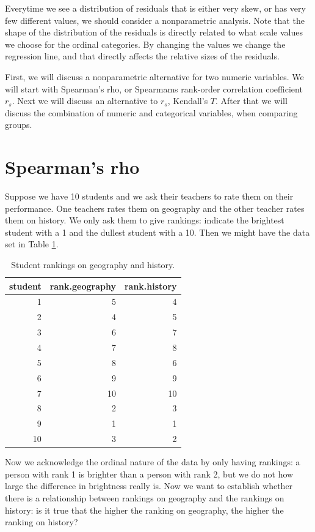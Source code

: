 \documentclass[]{report}\usepackage[]{graphicx}\usepackage[]{color}
\begin{document}
Everytime we see a distribution of residuals that is either very skew, or has very few different values, we should consider a nonparametric analysis. Note that the shape of the distribution of the residuals is directly related to what scale values we choose for the ordinal categories. By changing the values we change the regression line, and that directly affects the relative sizes of the residuals. 

First, we will discuss a nonparametric alternative for two numeric variables. We will start with Spearman's rho, or Spearmams rank-order correlation coefficient $r_s$. Next we will discuss an alternative to $r_s$, Kendall's $T$. After that we will discuss the combination of numeric and categorical variables, when comparing groups.

\section{Spearman's rho}

Suppose we have 10 students and we ask their teachers to rate them on their performance. One teachers rates them on geography and the other teacher rates them on history. We only ask them to give rankings: indicate the brightest student with a 1 and the dullest student with a 10. Then we might have the data set in Table \ref{tab:nonpar_3}.

\begin{table}[ht]
\centering
\caption{Student rankings on geography and history.} 
\label{tab:nonpar_3}
\begin{tabular}{rrr}
  \hline
student & rank.geography & rank.history \\ 
  \hline
1 & 5 & 4 \\ 
  2 & 4 & 5 \\ 
  3 & 6 & 7 \\ 
  4 & 7 & 8 \\ 
  5 & 8 & 6 \\ 
  6 & 9 & 9 \\ 
  7 & 10 & 10 \\ 
  8 & 2 & 3 \\ 
  9 & 1 & 1 \\ 
  10 & 3 & 2 \\ 
   \hline
\end{tabular}
\end{table}


Now we acknowledge the ordinal nature of the data by only having rankings: a person with rank 1 is brighter than a person with rank 2, but we do not how large the difference in brightness really is. Now we want to establish whether there is a relationship between rankings on geography and the rankings on history: is it true that the higher the ranking on geography, the higher the ranking on history?
\end{document}
